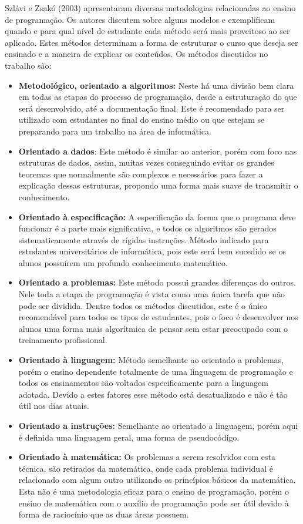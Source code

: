 \nocite{methods}
Szlávi e Zsakó (2003) apresentaram diversas metodologias relacionadas ao ensino de programação. Os autores discutem sobre alguns modelos e exemplificam quando e para qual nível de estudante cada método será mais proveitoso ao ser aplicado. Estes métodos determinam a forma de estruturar o curso que deseja ser ensinado e a maneira de explicar os conteúdos. Os métodos discutidos no trabalho são:

\begin{itemize}[leftmargin=-.001in]
\itemsep0em
\item \textbf{Metodológico, orientado a algoritmos:} Neste há uma divisão bem clara em todas as etapas do processo de programação, desde a estruturação do que será desenvolvido, até a documentação final. Este é recomendado para ser utilizado com estudantes no final do ensino médio ou que estejam se preparando para um trabalho na área de informática.
\item \textbf{Orientado a dados}: Este método é similar ao anterior, porém com foco nas estruturas de dados, assim, muitas vezes conseguindo evitar os grandes teoremas que normalmente são complexos e necessários para fazer a explicação dessas estruturas, propondo uma forma mais suave de transmitir o conhecimento.
\item \textbf{Orientado à especificação:} A especificação da forma que o programa deve funcionar é a parte mais significativa, e todos os algoritmos são gerados sistematicamente através de rígidas instruções. Método indicado para estudantes universitários de informática, pois este será bem sucedido se os alunos possuírem um profundo conhecimento matemático.
\item \textbf{Orientado a problemas:} Este método possui grandes diferenças do outros. Nele toda a etapa de programação é vista como uma única tarefa que não pode ser dividida. Dentre todos os métodos discutidos, este é o único recomendável para todos os tipos de estudantes, pois o foco é desenvolver nos alunos uma forma mais algorítmica de pensar sem estar preocupado com o treinamento profissional.
\item \textbf{Orientado à linguagem:} Método semelhante ao orientado a problemas, porém o ensino dependente totalmente de uma linguagem de programação e todos os ensinamentos são voltados especificamente para a linguagem adotada. Devido a estes fatores esse método está desatualizado e não é tão útil nos dias atuais.
\item \textbf{Orientado a instruções:} Semelhante ao orientado a linguagem, porém aqui é definida uma linguagem geral, uma forma de pseudocódigo.
\item \textbf{Orientado à matemática:} Os problemas a serem resolvidos com esta técnica, são retirados da matemática, onde cada problema individual é relacionado com algum outro utilizando os princípios básicos da matemática. Esta não é uma metodologia eficaz para o ensino de programação, porém o ensino de matemática com o auxílio de programação pode ser útil devido à forma de raciocínio que as duas áreas possuem.

\end{itemize}

